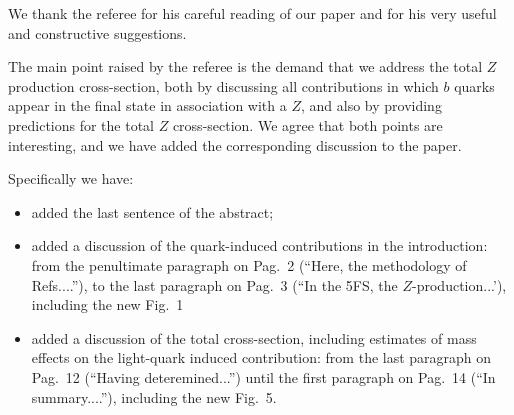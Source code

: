 \documentclass[12pt]{article}
\begin{document}
We thank the referee for his careful reading of our paper and for his
very useful and constructive suggestions.

The main point raised by the referee is the demand that we address the
total $Z$ production cross-section, both by discussing all
contributions in which $b$ quarks appear in the final state in
association with a $Z$, and also by providing predictions for the
total $Z$ cross-section. We agree that both points are interesting,
and we have added the corresponding discussion to the paper.

Specifically we have:
\begin{itemize}
\item added the last sentence of the abstract;
\item added a discussion of the quark-induced contributions in the
  introduction: from  the penultimate paragraph on Pag.~2
  (``Here, the methodology of Refs....''), 
to the last paragraph on Pag.~3
  (``In the 5FS, the $Z$-production...'), including the new Fig.~1
\item added a discussion of the total cross-section, including
  estimates of mass effects on the light-quark induced contribution:
  from the last paragraph on Pag.~12 (``Having deteremined...'') until
  the first paragraph on Pag.~14 (``In summary....''), including the
  new Fig.~5.
\end{itemize}
\end{document}
